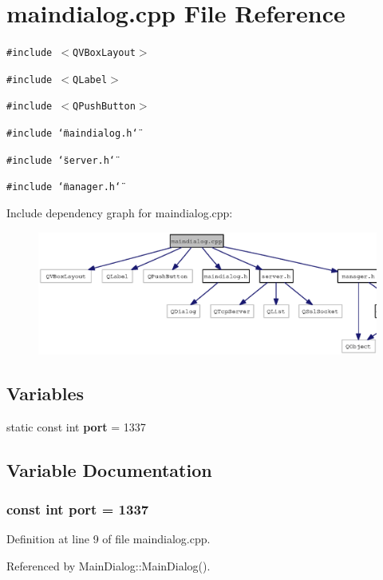 \section{maindialog.cpp File Reference}
\label{maindialog_8cpp}
{\tt \#include $<$QVBoxLayout$>$}\par
{\tt \#include $<$QLabel$>$}\par
{\tt \#include $<$QPushButton$>$}\par
{\tt \#include \char`\"{}maindialog.h\char`\"{}}\par
{\tt \#include \char`\"{}server.h\char`\"{}}\par
{\tt \#include \char`\"{}manager.h\char`\"{}}\par


Include dependency graph for maindialog.cpp:\nopagebreak
\begin{figure}[H]
\begin{center}
\leavevmode
\includegraphics[width=356pt]{maindialog_8cpp__incl}
\end{center}
\end{figure}
\subsection*{Variables}
\begin{CompactItemize}
\item 
static const int {\bf port} = 1337
\end{CompactItemize}


\subsection{Variable Documentation}
\subsubsection{\setlength{\rightskip}{0pt plus 5cm}const int {\bf port} = 1337\hspace{0.3cm}{\tt  [static]}}\label{maindialog_8cpp_0eb069d5f53d3e9269b0f321cfbcf108}




Definition at line 9 of file maindialog.cpp.

Referenced by MainDialog::MainDialog().